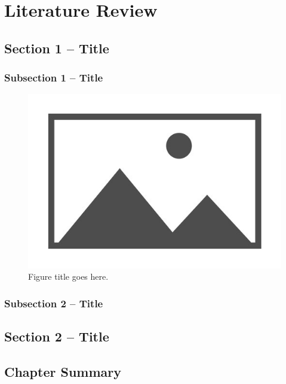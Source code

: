 \chapter{Literature Review} \label{chap:LiteratureReview} 

\section{Section 1 -- Title}
\label{sec:Section1}

\subsection{Subsection 1 -- Title}\label{subsub:Subsection1}
\lipsum[2]

\begin{figure}[tb] 
	\centering
	\includegraphics[width=0.625\linewidth]{Figures/Chap02/todopicture.jpg}
	\vspace{-4mm}
	\caption{Figure title goes here.}
	\label{fig:FIg1_SoftMobileRobotCategory} 
\end{figure}


\subsection{Subsection 2 -- Title}\label{subsub:Subsection2}
\lipsum[2]



\section{Section 2 -- Title}\label{sec:Section02}

\lipsum[2]


\section{Chapter Summary}

\lipsum[2]


